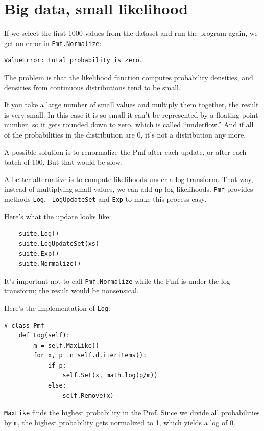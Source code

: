 \documentclass[12pt]{book}
\begin{document}
\section{Big data, small likelihood}

If we select the first 1000 values from the dataset and run
the program again, we get an error in \verb"Pmf.Normalize":

\begin{verbatim}
ValueError: total probability is zero.
\end{verbatim}

The problem is that the likelihood function computes
probability densities, and densities from continuous
distributions tend to be small.

If you take a large number of small values and multiply them together,
the result is very small.  In this case it is so small it can't be
represented by a floating-point number, so it gets rounded down to
zero, which is called ``underflow.''  And if all of the probabilities
in the distribution are 0, it's not a distribution any more.

A possible solution is to renormalize the Pmf after each update,
or after each batch of 100.  But that would be slow.

A better alternative is to compute likelihoods under a log
transform.  That way, instead of multiplying small values, we can add
up log likelihoods.  {\tt Pmf} provides methods {\tt Log}, {\tt
  LogUpdateSet} and {\tt Exp} to make this process easy.

Here's what the update looks like:

\begin{verbatim}
    suite.Log()
    suite.LogUpdateSet(xs)
    suite.Exp()
    suite.Normalize()
\end{verbatim}

It's important not to call \verb"Pmf.Normalize" while the Pmf
is under the log transform; the result would be nonsensical.

Here's the implementation of {\tt Log}:

\begin{verbatim}
# class Pmf
    def Log(self):
        m = self.MaxLike()
        for x, p in self.d.iteritems():
            if p:
                self.Set(x, math.log(p/m))
            else:
                self.Remove(x)
\end{verbatim}

{\tt MaxLike} finds the highest probability in the Pmf.  Since we
divide all probabilities by {\tt m}, the highest probability gets
normalized to 1, which yields a log of 0.
\end{document}
